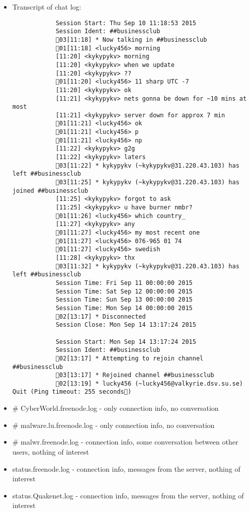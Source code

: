 \begin{enumerate}
\begin{itemize}
\begin{itemize}
\begin{itemize}
		 	\item Transcript of chat log:
		 	\begin{verbatim} 	
		 	Session Start: Thu Sep 10 11:18:53 2015
		 	Session Ident: ##businessclub
		 	03[11:18] * Now talking in ##businessclub
		 	01[11:18] <lucky456> morning
		 	[11:20] <kykypykv> morning
		 	[11:20] <kykypykv> when we update
		 	[11:20] <kykypykv> ??
		 	01[11:20] <lucky456> 11 sharp UTC -7
		 	[11:20] <kykypykv> ok
		 	[11:21] <kykypykv> nets gonna be down for ~10 mins at most
		 	[11:21] <kykypykv> server down for approx 7 min
		 	01[11:21] <lucky456> ok 
		 	01[11:21] <lucky456> p
		 	01[11:21] <lucky456> np
		 	[11:22] <kykypykv> g2g
		 	[11:22] <kykypykv> laters
		 	03[11:22] * kykypykv (~kykypykv@31.220.43.103) has left ##businessclub
		 	03[11:25] * kykypykv (~kykypykv@31.220.43.103) has joined ##businessclub
		 	[11:25] <kykypykv> forgot to ask
		 	[11:25] <kykypykv> u have burner nmbr?
		 	01[11:26] <lucky456> which country_
		 	[11:27] <kykypykv> any
		 	01[11:27] <lucky456> my most recent one
		 	01[11:27] <lucky456> 076-965 01 74 
		 	01[11:27] <lucky456> swedish
		 	[11:28] <kykypykv> thx
		 	03[11:32] * kykypykv (~kykypykv@31.220.43.103) has left ##businessclub
		 	Session Time: Fri Sep 11 00:00:00 2015
		 	Session Time: Sat Sep 12 00:00:00 2015
		 	Session Time: Sun Sep 13 00:00:00 2015
		 	Session Time: Mon Sep 14 00:00:00 2015
		 	02[13:17] * Disconnected
		 	Session Close: Mon Sep 14 13:17:24 2015
		 	
		 	Session Start: Mon Sep 14 13:17:24 2015
		 	Session Ident: ##businessclub
		 	02[13:17] * Attempting to rejoin channel ##businessclub
		 	03[13:17] * Rejoined channel ##businessclub
		 	02[13:19] * lucky456 (~lucky456@valkyrie.dsv.su.se) Quit (Ping timeout: 255 seconds)
		 	\end{verbatim}
		 	
		 	\item \# CyberWorld.freenode.log - only connection info, no conversation
		 	\item \# malware.lu.freenode.log - only connection info, no conversation
		 	\item \# malwr.freenode.log - connection info, some conversation between other users, nothing of interest
		 	\item status.freenode.log - connection info, messages from the server, nothing of interest
		 	\item status.Quakenet.log - connection info, messages from the server, nothing of interest
		 	

\end{itemize}
\end{itemize}
\end{itemize}
\end{enumerate}
